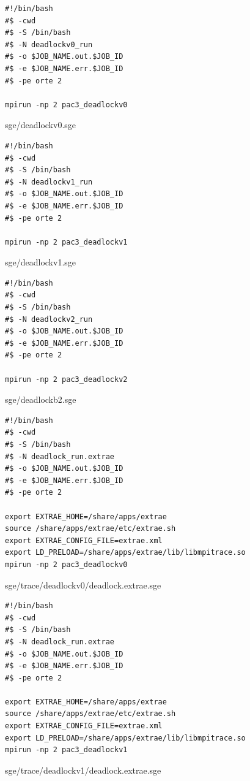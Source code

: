 \documentclass[12pt]{article}
\begin{document}
\begin{figure}[h!]
	\begin{verbatim}
#!/bin/bash
#$ -cwd
#$ -S /bin/bash
#$ -N deadlockv0_run
#$ -o $JOB_NAME.out.$JOB_ID
#$ -e $JOB_NAME.err.$JOB_ID
#$ -pe orte 2

mpirun -np 2 pac3_deadlockv0
	\end{verbatim}
	\caption{sge/deadlockv0.sge}\label{code:deadlockv0sge}
\end{figure}

\newpage

\begin{figure}[h!]
	\begin{verbatim}
#!/bin/bash
#$ -cwd
#$ -S /bin/bash
#$ -N deadlockv1_run
#$ -o $JOB_NAME.out.$JOB_ID
#$ -e $JOB_NAME.err.$JOB_ID
#$ -pe orte 2

mpirun -np 2 pac3_deadlockv1
	\end{verbatim}
	\caption{sge/deadlockv1.sge}\label{code:deadlockv1sge}
\end{figure}

\begin{figure}[h!]
	\begin{verbatim}
#!/bin/bash
#$ -cwd
#$ -S /bin/bash
#$ -N deadlockv2_run
#$ -o $JOB_NAME.out.$JOB_ID
#$ -e $JOB_NAME.err.$JOB_ID
#$ -pe orte 2

mpirun -np 2 pac3_deadlockv2
	\end{verbatim}
	\caption{sge/deadlockb2.sge}\label{code:deadlockv2sge}
\end{figure}

\begin{figure}[h!]
	\begin{verbatim}
#!/bin/bash
#$ -cwd
#$ -S /bin/bash
#$ -N deadlock_run.extrae
#$ -o $JOB_NAME.out.$JOB_ID
#$ -e $JOB_NAME.err.$JOB_ID
#$ -pe orte 2

export EXTRAE_HOME=/share/apps/extrae
source /share/apps/extrae/etc/extrae.sh
export EXTRAE_CONFIG_FILE=extrae.xml
export LD_PRELOAD=/share/apps/extrae/lib/libmpitrace.so
mpirun -np 2 pac3_deadlockv0
	\end{verbatim}
	\caption{sge/trace/deadlockv0/deadlock.extrae.sge}\label{code:deadlockv0tsge}
\end{figure}

\newpage

\begin{figure}[h!]
	\begin{verbatim}
#!/bin/bash
#$ -cwd
#$ -S /bin/bash
#$ -N deadlock_run.extrae
#$ -o $JOB_NAME.out.$JOB_ID
#$ -e $JOB_NAME.err.$JOB_ID
#$ -pe orte 2

export EXTRAE_HOME=/share/apps/extrae
source /share/apps/extrae/etc/extrae.sh
export EXTRAE_CONFIG_FILE=extrae.xml
export LD_PRELOAD=/share/apps/extrae/lib/libmpitrace.so
mpirun -np 2 pac3_deadlockv1
	\end{verbatim}
	\caption{sge/trace/deadlockv1/deadlock.extrae.sge}\label{code:deadlockv1tsge}
\end{figure}
\end{document}
